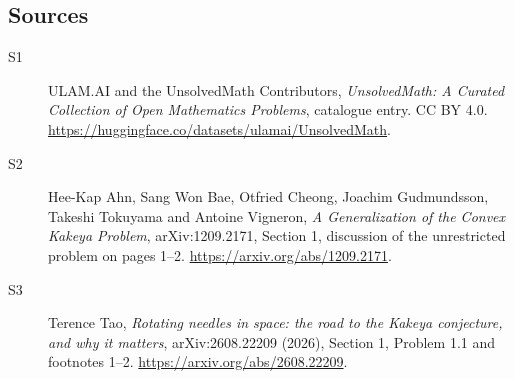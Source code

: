 \documentclass[11pt]{article}
\begin{document}
\subsection{Sources}
\begin{description}
\item[\hypertarget{source:statement:1}{S1}] ULAM.AI and the UnsolvedMath Contributors, \emph{UnsolvedMath: A Curated Collection of Open Mathematics Problems}, catalogue entry. CC BY 4.0. \url{https://huggingface.co/datasets/ulamai/UnsolvedMath}.
\item[\hypertarget{source:statement:2}{S2}] Hee-Kap Ahn, Sang Won Bae, Otfried Cheong, Joachim Gudmundsson, Takeshi Tokuyama and Antoine Vigneron, \emph{A Generalization of the Convex Kakeya Problem}, arXiv:1209.2171, Section 1, discussion of the unrestricted problem on pages 1--2. \url{https://arxiv.org/abs/1209.2171}.
\item[\hypertarget{source:statement:3}{S3}] Terence Tao, \emph{Rotating needles in space: the road to the Kakeya conjecture, and why it matters}, arXiv:2608.22209 (2026), Section 1, Problem 1.1 and footnotes 1--2. \url{https://arxiv.org/abs/2608.22209}.
\end{description}
\label{end:statement}
\end{document}
